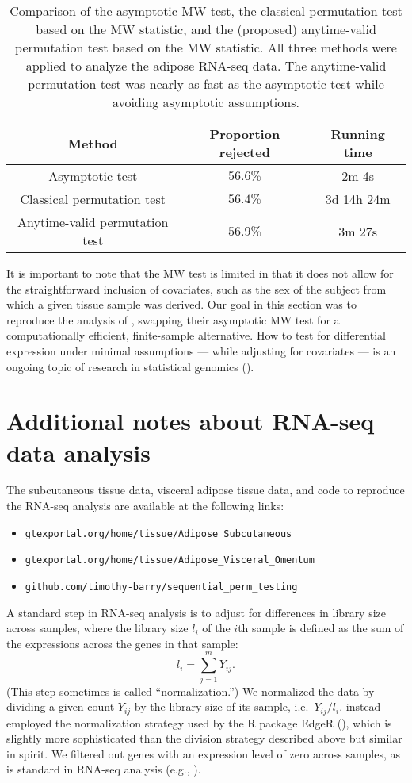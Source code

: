 \documentclass[12pt]{article}
\begin{document}
	\begin{table}\caption{Comparison of the asymptotic MW test, the classical permutation test based on the MW statistic, and the (proposed) anytime-valid permutation test based on the MW statistic. All three methods were applied to analyze the adipose RNA-seq data. The anytime-valid permutation test was nearly as fast as the asymptotic test while avoiding asymptotic assumptions.}
	\centering
	\begin{tabular}{|c|c|c|}
		\hline
		\textbf{Method} & \textbf{Proportion rejected} & \textbf{Running time} \\
		\hline
		Asymptotic test & $56.6\%$  & 2m 4s \\
		\hline
		Classical permutation test & $56.4\%$  & 3d 14h 24m  \\
		\hline
		Anytime-valid permutation test & $56.9\%$ & 3m 27s \\
		\hline
	\end{tabular}
	\end{table}
	
	It is important to note that the MW test is limited in that it does not allow for the straightforward inclusion of covariates, such as the sex of the subject from which a given tissue sample was derived. Our goal in this section was to reproduce the analysis of \cite{Li2022}, swapping their asymptotic MW test for a computationally efficient, finite-sample alternative. How to test for differential expression under minimal assumptions --- while adjusting for covariates --- is an ongoing topic of research in statistical genomics (\cite{Niu2024}).
	
	\section{Additional notes about RNA-seq data analysis}
	
	The subcutaneous tissue data, visceral adipose tissue data, and code to reproduce the RNA-seq analysis are available at the following links:
	\begin{itemize}
		\item \texttt{gtexportal.org/home/tissue/Adipose\_Subcutaneous}
		\item \texttt{gtexportal.org/home/tissue/Adipose\_Visceral\_Omentum}
		\item \texttt{github.com/timothy-barry/sequential\_perm\_testing}
	\end{itemize}	
	A standard step in RNA-seq analysis is to adjust for differences in library size across samples, where the library size $l_i$ of the $i$th sample is defined as the sum of the expressions across the genes in that sample:
	$$l_i = \sum_{j=1}^m Y_{ij}.$$ (This step sometimes is called ``normalization.'') We normalized the data by dividing a given count $Y_{ij}$ by the library size of its sample, i.e.\ $Y_{ij}/l_i$. \cite{Li2022} instead employed the normalization strategy used by the R package EdgeR (\cite{Robinson2010}), which is slightly more sophisticated than the division strategy described above but similar in spirit. We filtered out genes with an expression level of zero across samples, as is standard in RNA-seq analysis (e.g., \cite{Love2014}).
	
	\printbibliography
	
\end{document}
